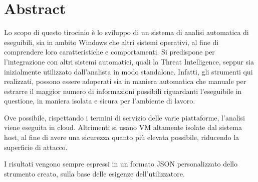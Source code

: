 \section*{Abstract}
Lo scopo di questo tirocinio è lo sviluppo di un sistema di analisi automatica di eseguibili, sia in ambito Windows che altri sistemi operativi, al fine di comprendere loro caratteristiche e comportamenti.
Si predispone per l'integrazione con altri sistemi automatici, quali la Threat Intelligence, seppur sia inizialmente utilizzato dall'analista in modo standalone.
Infatti, gli strumenti qui realizzati, possono essere adoperati sia in maniera automatica che manuale per estrarre il maggior numero di informazioni possibili riguardanti l'eseguibile in questione, in maniera isolata e sicura per l'ambiente di lavoro.

Ove possibile, rispettando i termini di servizio delle varie piattaforme, l'analisi viene eseguita in cloud. Altrimenti si usano VM altamente isolate dal sistema host, al fine di avere una sicurezza quanto più elevata possibile, riducendo la superficie di attacco.

I risultati vengono sempre espressi in un formato JSON personalizzato dello strumento creato, sulla base delle esigenze dell'utilizzatore.